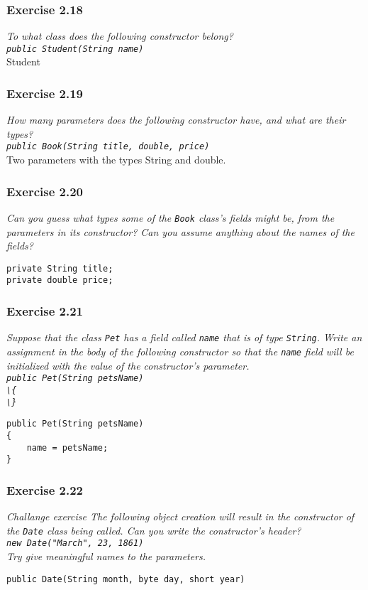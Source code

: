 \subsubsection*{Exercise 2.18}
\textit{To what class does the following constructor belong? \\
\lstinline{public Student(String name)}}\\
Student

\subsubsection*{Exercise 2.19}
\textit{How many parameters does the following constructor have, and what are 
their types? \\
\lstinline{public Book(String title, double, price)}}\\
Two parameters with the types String and double. 

\subsubsection*{Exercise 2.20}
\textit{Can you guess what types some of the \lstinline{Book} class's fields might 
be, from the parameters in its constructor? Can you assume anything about the 
names of the fields? }\\
\begin{lstlisting}[caption=Solution for Exercise 2.20]
private String title;
private double price;
\end{lstlisting}

\subsubsection*{Exercise 2.21}
\textit{Suppose that the class \lstinline{Pet} has a field called \lstinline{name} that 
is of type \lstinline{String}. Write an assignment in the body of the following 
constructor so that the \lstinline{name} field will be initialized with the value 
of the constructor's parameter. \\
\lstinline{public Pet(String petsName)}\\
\lstinline!\{!\\
\lstinline!\}!}\\
\begin{lstlisting}[caption=Solution for Exercise 2.21]
public Pet(String petsName)
{
	name = petsName;
}
\end{lstlisting}

\subsubsection*{Exercise 2.22}
\textit{Challange exercise The following object creation will result in the 
constructor of the \lstinline{Date} class being called. Can you write the 
constructor's header? \\
\lstinline{new Date("March", 23, 1861)}\\
Try give meaningful names to the parameters. }\\
\begin{lstlisting}[caption=Solution for Exercise 2.22]
public Date(String month, byte day, short year)
\end{lstlisting}
